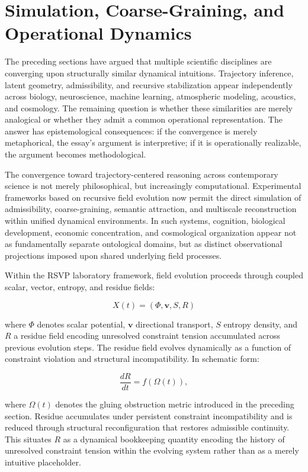 \documentclass[12pt,a4paper]{article}
\begin{document}
\section{Simulation, Coarse-Graining, and Operational Dynamics}

The preceding sections have argued that multiple scientific disciplines are converging
upon structurally similar dynamical intuitions. Trajectory inference, latent geometry,
admissibility, and recursive stabilization appear independently across biology,
neuroscience, machine learning, atmospheric modeling, acoustics, and cosmology. The
remaining question is whether these similarities are merely analogical or whether they
admit a common operational representation. The answer has epistemological consequences:
if the convergence is merely metaphorical, the essay's argument is interpretive; if it
is operationally realizable, the argument becomes methodological.

The convergence toward trajectory-centered reasoning across contemporary science is
not merely philosophical, but increasingly computational. Experimental frameworks
based on recursive field evolution now permit the direct simulation of admissibility,
coarse-graining, semantic attraction, and multiscale reconstruction within unified
dynamical environments. In such systems, cognition, biological development, economic
concentration, and cosmological organization appear not as fundamentally separate
ontological domains, but as distinct observational projections imposed upon shared
underlying field processes.

Within the RSVP laboratory framework, field evolution proceeds through coupled scalar,
vector, entropy, and residue fields:

\[
X(t) = (\Phi, \mathbf{v}, S, R)
\]

where $\Phi$ denotes scalar potential, $\mathbf{v}$ directional transport, $S$ entropy
density, and $R$ a residue field encoding unresolved constraint tension accumulated
across previous evolution steps. The residue field evolves dynamically as a function
of constraint violation and structural incompatibility. In schematic form:

\[
\frac{dR}{dt} = f(\Omega(t)),
\]

where $\Omega(t)$ denotes the gluing obstruction metric introduced in the preceding
section. Residue accumulates under persistent constraint incompatibility and is reduced
through structural reconfiguration that restores admissible continuity. This situates
$R$ as a dynamical bookkeeping quantity encoding the history of unresolved constraint
tension within the evolving system rather than as a merely intuitive placeholder.
\end{document}
